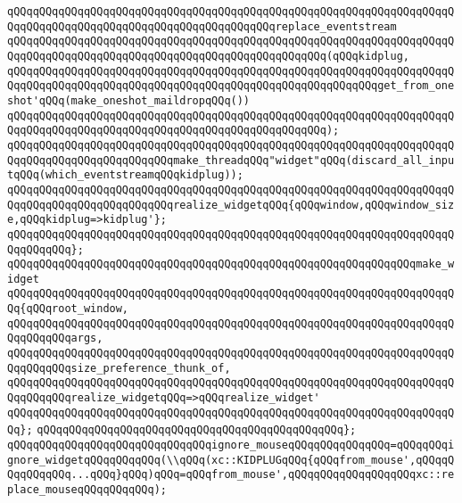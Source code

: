 \verb|qQQqqQQqqQQqqQQqqQQqqQQqqQQqqQQqqQQqqQQqqQQqqQQqqQQqqQQqqQQqqQQqqQQqqQQqqQQqqQQqqQQqqQQqqQQqqQQqqQQqqQQqqQQqqQQqreplace_eventstream|\newline
\verb|qQQqqQQqqQQqqQQqqQQqqQQqqQQqqQQqqQQqqQQqqQQqqQQqqQQqqQQqqQQqqQQqqQQqqQQqqQQqqQQqqQQqqQQqqQQqqQQqqQQqqQQqqQQqqQQqqQQqqQQq(qQQqkidplug,|\newline
\verb|qQQqqQQqqQQqqQQqqQQqqQQqqQQqqQQqqQQqqQQqqQQqqQQqqQQqqQQqqQQqqQQqqQQqqQQqqQQqqQQqqQQqqQQqqQQqqQQqqQQqqQQqqQQqqQQqqQQqqQQqqQQqqQQqget_from_oneshot'qQQq(make_oneshot_maildropqQQq())|\newline
\verb|qQQqqQQqqQQqqQQqqQQqqQQqqQQqqQQqqQQqqQQqqQQqqQQqqQQqqQQqqQQqqQQqqQQqqQQqqQQqqQQqqQQqqQQqqQQqqQQqqQQqqQQqqQQqqQQqqQQqqQQq);|\newline
\newline
\verb|qQQqqQQqqQQqqQQqqQQqqQQqqQQqqQQqqQQqqQQqqQQqqQQqqQQqqQQqqQQqqQQqqQQqqQQqqQQqqQQqqQQqqQQqqQQqqQQqmake_threadqQQq"widget"qQQq(discard_all_inputqQQq(which_eventstreamqQQqkidplug));|\newline
\newline
\verb|qQQqqQQqqQQqqQQqqQQqqQQqqQQqqQQqqQQqqQQqqQQqqQQqqQQqqQQqqQQqqQQqqQQqqQQqqQQqqQQqqQQqqQQqqQQqqQQqrealize_widgetqQQq{qQQqwindow,qQQqwindow_size,qQQqkidplug=>kidplug'};|\newline
\verb|qQQqqQQqqQQqqQQqqQQqqQQqqQQqqQQqqQQqqQQqqQQqqQQqqQQqqQQqqQQqqQQqqQQqqQQqqQQqqQQq};|\newline
\newline
\verb|qQQqqQQqqQQqqQQqqQQqqQQqqQQqqQQqqQQqqQQqqQQqqQQqqQQqqQQqqQQqqQQqmake_widget|\newline
\verb|qQQqqQQqqQQqqQQqqQQqqQQqqQQqqQQqqQQqqQQqqQQqqQQqqQQqqQQqqQQqqQQqqQQqqQQq{qQQqroot_window,|\newline
\verb|qQQqqQQqqQQqqQQqqQQqqQQqqQQqqQQqqQQqqQQqqQQqqQQqqQQqqQQqqQQqqQQqqQQqqQQqqQQqqQQqargs,|\newline
\verb|qQQqqQQqqQQqqQQqqQQqqQQqqQQqqQQqqQQqqQQqqQQqqQQqqQQqqQQqqQQqqQQqqQQqqQQqqQQqqQQqsize_preference_thunk_of,|\newline
\verb|qQQqqQQqqQQqqQQqqQQqqQQqqQQqqQQqqQQqqQQqqQQqqQQqqQQqqQQqqQQqqQQqqQQqqQQqqQQqqQQqrealize_widgetqQQq=>qQQqrealize_widget'|\newline
\verb|qQQqqQQqqQQqqQQqqQQqqQQqqQQqqQQqqQQqqQQqqQQqqQQqqQQqqQQqqQQqqQQqqQQqqQQq};|\newline
\verb|qQQqqQQqqQQqqQQqqQQqqQQqqQQqqQQqqQQqqQQqqQQqqQQq};|\newline
\newline
\verb|qQQqqQQqqQQqqQQqqQQqqQQqqQQqqQQqignore_mouseqQQqqQQqqQQqqQQq=qQQqqQQqignore_widgetqQQqqQQqqQQq(\\qQQq(xc::KIDPLUGqQQq{qQQqfrom_mouse',qQQqqQQqqQQqqQQq...qQQq}qQQq)qQQq=qQQqfrom_mouse',qQQqqQQqqQQqqQQqqQQqxc::replace_mouseqQQqqQQqqQQq);|\newline
